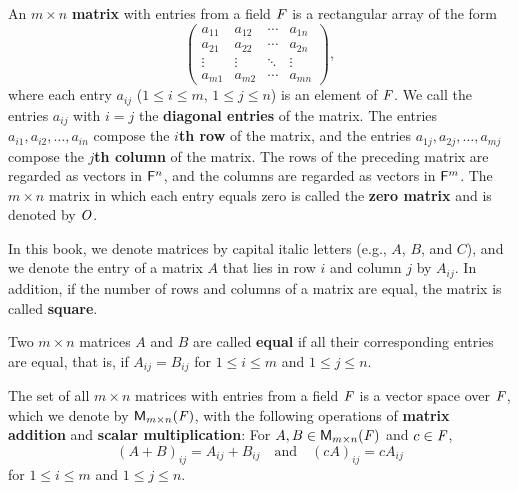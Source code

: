 \begin{defn}\label{1.2.6}
  An \(m \times n\) \textbf{matrix} with entries from a field \(\mathit{F}\) is a rectangular array of the form
  \[
    \begin{pmatrix}
      a_{1 1} & a_{1 2} & \cdots & a_{1 n} \\
      a_{2 1} & a_{2 2} & \cdots & a_{2 n} \\
      \vdots  & \vdots  & \ddots & \vdots  \\
      a_{m 1} & a_{m 2} & \cdots & a_{m n}
    \end{pmatrix},
  \]
  where each entry \(a_{i j}\) (\(1 \leq i \leq m\), \(1 \leq j \leq n\)) is an element of \(\mathit{F}\).
  We call the entries \(a_{i j}\) with \(i = j\) the \textbf{diagonal entries} of the matrix.
  The entries \(a_{i 1} ,a_{i 2} , \dots, a_{i n}\) compose the \textbf{\(i\)th row} of the matrix, and the entries \(a_{1 j}, a_{2 j}, \dots, a_{m j}\) compose the \textbf{\(j\)th column} of the matrix.
  The rows of the preceding matrix are regarded as vectors in \(\mathsf{F}^n\), and the columns are regarded as vectors in \(\mathsf{F}^m\).
  The \(m \times n\) matrix in which each entry equals zero is called the \textbf{zero matrix} and is denoted by \(\mathit{O}\).
\end{defn}

\begin{defn}\label{1.2.7}
  In this book, we denote matrices by capital italic letters (e.g., \(A\), \(B\), and \(C\)), and we denote the entry of a matrix \(A\) that lies in row \(i\) and column \(j\) by \(A_{i j}\).
  In addition, if the number of rows and columns of a matrix are equal, the matrix is called \textbf{square}.
\end{defn}

\begin{defn}\label{1.2.8}
  Two \(m \times n\) matrices \(A\) and \(B\) are called \textbf{equal} if all their corresponding entries are equal, that is, if \(A_{i j} = B_{i j}\) for \(1 \leq i \leq m\) and \(1 \leq j \leq n\).
\end{defn}

\begin{eg}\label{1.2.9}
  The set of all \(m \times n\) matrices with entries from a field \(\mathit{F}\) is a vector space over \(\mathit{F}\), which we denote by \(\ms\), with the following operations of \textbf{matrix addition} and \textbf{scalar multiplication}:
  For \(A, B \in \ms\) and \(c \in \mathit{F}\),
  \[
    (A + B)_{i j} = A_{i j} + B_{i j} \quad \text{and} \quad (c A)_{i j} = c A_{i j}
  \]
  for \(1 \leq i \leq m\) and \(1 \leq j \leq n\).
\end{eg}

